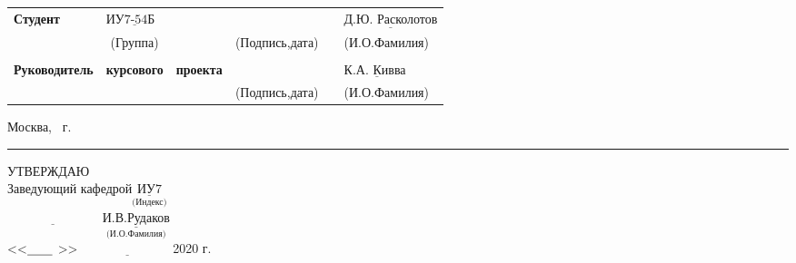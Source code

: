 \documentclass[12pt,a4paper,oneside]{report}
\begin{document}
	\begin{tabular}{lcp{5em}lp{2em}l}
		\noindent\textbf{Студент} &  $\underline{\text{ИУ7-54Б~~}}$ &             &\hspace{1cm} & & $\underline{\text{Д.Ю. Расколотов}}$ \\\cline{4-3}
		& (Группа) & &(Подпись,дата)  & & (И.О.Фамилия) \\
		& & & & &\\
		\noindent\textbf{Руководитель} & \textbf{курсового} &  \textbf{проекта}&\hspace{1cm} & &$\underline{\text{К.А. Кивва~}}$ \\\cline{4-3} 
		&  & & (Подпись,дата)  & &(И.О.Фамилия) \\
	\end{tabular}
	
	\begin{center}
		\vfill
		Москва, \the\year
		~г.
	\end{center}
	\clearpage
	\newpage
		\begin{center}
		\noindent\rule{\textwidth}{2pt}
	\end{center}
	\begin{flushright}
		\small{УТВЕРЖДАЮ \\
			Заведующий кафедрой$\underset{\text{(Индекс)}}{\underline{\text{ИУ7}}}$ 
			\\ \vspace{1mm} $\underset{}{\underline{\hspace{3cm}}}$ \hspace{2mm}$\underset{\text{(И.О.Фамилия)}}{\underline{\text{И.В.Рудаков}}}$
			\\ \vspace{1mm}<<$\underset{}{\underline{\hspace{0.7cm}}}$ >> $\underset{}{\underline{\hspace{3cm}}}$2020 г.} 
	\end{flushright}
	
\end{document}
